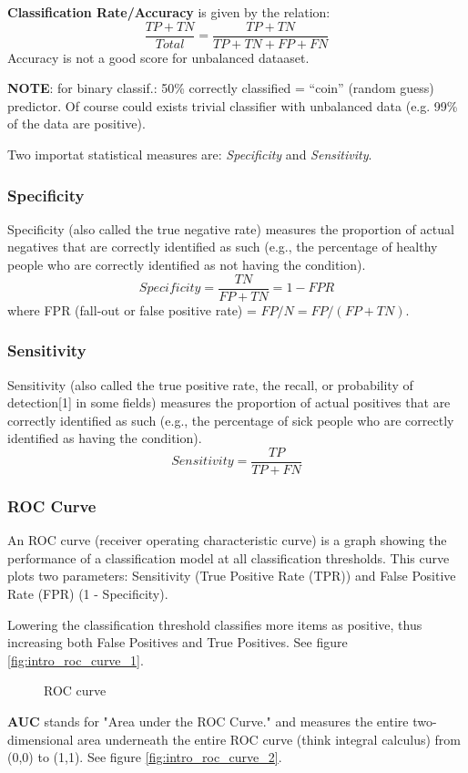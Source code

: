 \documentclass[../main.tex]{subfiles}
\begin{document}
\noindent\textbf{Classification Rate/Accuracy} is given by the relation:
$$ \frac{TP + TN}{Total} = \frac{TP + TN}{ TP + TN + FP + FN}$$ 
Accuracy is not a good score for unbalanced dataaset.

\textbf{NOTE}: for binary classif.: 50\% correctly classified = “coin” (random guess) predictor. Of course could exists trivial classifier with unbalanced data (e.g. 99\% of the data are positive).

Two importat statistical measures are: \textit{Specificity} and \textit{Sensitivity}.

\subsubsection*{Specificity}%
Specificity (also called the true negative rate) measures the proportion of actual negatives that are correctly identified as such (e.g., the percentage of healthy people who are correctly identified as not having the condition).
$$ Specificity = \frac{TN}{FP + TN} = 1 - FPR $$
where FPR (fall-out or false positive rate) = $FP/N = FP/(FP + TN)$.

\subsubsection*{Sensitivity}
Sensitivity (also called the true positive rate, the recall, or probability of detection[1] in some fields) measures the proportion of actual positives that are correctly identified as such (e.g., the percentage of sick people who are correctly identified as having the condition).
$$ Sensitivity = \frac{TP}{TP + FN}$$


\subsubsection*{ROC Curve}
An ROC curve (receiver operating characteristic curve) is a graph showing the performance of a classification model at all classification thresholds. This curve plots two parameters: Sensitivity (True Positive Rate (TPR)) and False Positive Rate (FPR) (1 - Specificity).

Lowering the classification threshold classifies more items as positive, thus increasing both False Positives and True Positives. See figure \ref{fig:intro_roc_curve_1}.

\begin{figure}[ht]
  \centering
  \hfill
  \caption{ROC curve}
\end{figure}
\textbf{AUC} stands for "Area under the ROC Curve." and measures the entire two-dimensional area underneath the entire ROC curve (think integral calculus) from (0,0) to (1,1). See figure \ref{fig:intro_roc_curve_2}.
\end{document}
